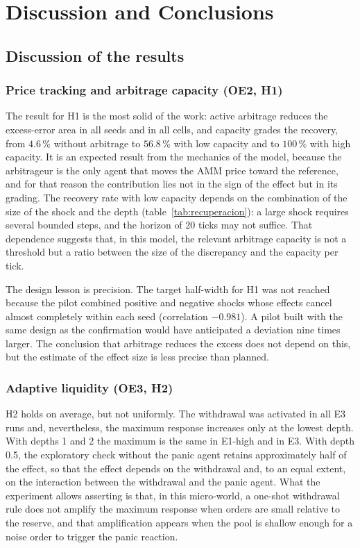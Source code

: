 \chapter{Discussion and Conclusions}
\label{cap:discusion}

\section{Discussion of the results}

\subsection{Price tracking and arbitrage capacity (OE2, H1)}

The result for H1 is the most solid of the work: active arbitrage reduces the excess-error area in all seeds and in all cells, and capacity grades the recovery, from $4.6\,\%$ without arbitrage to $56.8\,\%$ with low capacity and to $100\,\%$ with high capacity. It is an expected result from the mechanics of the model, because the arbitrageur is the only agent that moves the AMM price toward the reference, and for that reason the contribution lies not in the sign of the effect but in its grading. The recovery rate with low capacity depends on the combination of the size of the shock and the depth (table~\ref{tab:recuperacion}): a large shock requires several bounded steps, and the horizon of 20 ticks may not suffice. That dependence suggests that, in this model, the relevant arbitrage capacity is not a threshold but a ratio between the size of the discrepancy and the capacity per tick.

The design lesson is precision. The target half-width for H1 was not reached because the pilot combined positive and negative shocks whose effects cancel almost completely within each seed (correlation $-0.981$). A pilot built with the same design as the confirmation would have anticipated a deviation nine times larger. The conclusion that arbitrage reduces the excess does not depend on this, but the estimate of the effect size is less precise than planned.

\subsection{Adaptive liquidity (OE3, H2)}

H2 holds on average, but not uniformly. The withdrawal was activated in all E3 runs and, nevertheless, the maximum response increases only at the lowest depth. With depths 1 and 2 the maximum is the same in E1-high and in E3. With depth 0.5, the exploratory check without the panic agent retains approximately half of the effect, so that the effect depends on the withdrawal and, to an equal extent, on the interaction between the withdrawal and the panic agent. What the experiment allows asserting is that, in this micro-world, a one-shot withdrawal rule does not amplify the maximum response when orders are small relative to the reserve, and that amplification appears when the pool is shallow enough for a noise order to trigger the panic reaction.

